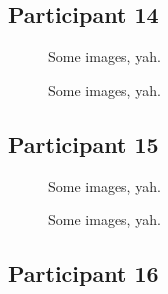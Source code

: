 \lipsum[1]

\lipsum[2]

\lipsum[3]


\clearpage

\subsection{Participant 14}

\begin{figure}[h]
	\caption{Some images, yah.}
\end{figure}

\lipsum[1]

\clearpage

\begin{figure}[h]
	\caption{Some images, yah.}
\end{figure}

\lipsum[1]


\clearpage

\subsection{Participant 15}

\begin{figure}[h]
	\caption{Some images, yah.}
\end{figure}

\lipsum[1]

\clearpage

\begin{figure}[h]
	\caption{Some images, yah.}
\end{figure}

\lipsum[1]


\clearpage

\subsection{Participant 16}


